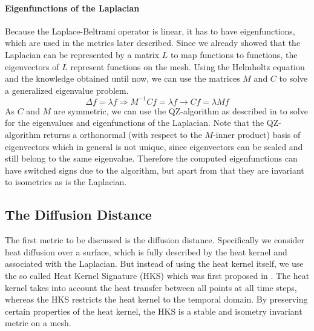 \paragraph{Eigenfunctions of the Laplacian}
Because the Laplace-Beltrami operator is linear, it has to have eigenfunctions, which are used in the metrics later described.
Since we already showed that the Laplacian can be represented by a matrix $L$ to map functions to functions, the eigenvectors of $L$ represent functions on the mesh.
Using the Helmholtz equation and the knowledge obtained until now, we can use the matrices $M$ and $C$ to solve a generalized eigenvalue problem.
\begin{equation}
	\Delta f = \lambda f \Rightarrow M^{-1}C f = \lambda f \rightarrow Cf = \lambda M f
	\label{eq:laplacian:eigenvalue}
\end{equation}
As $C$ and $M$ are symmetric, we can use the QZ-algorithm as described in \cite{moler1973algorithm} to solve for the eigenvalues and eigenfunctions of the Laplacian.
Note that the QZ-algorithm returns a orthonormal (with respect to the $M$-inner product) basis of eigenvectors which in general is not unique, since eigenvectors can be scaled and still belong to the same eigenvalue.
Therefore the computed eigenfunctions can have switched signs due to the algorithm, but apart from that they are invariant to isometries as is the Laplacian.

\subsection{The Diffusion Distance}
The first metric to be discussed is the diffusion distance.
Specifically we consider heat diffusion over a surface, which is fully described by the heat kernel and associated with the Laplacian.
But instead of using the heat kernel itself, we use the so called Heat Kernel Signature (HKS) which was first proposed in \cite{sun2009concise}.
The heat kernel takes into account the heat transfer between all points at all time steps, whereas the HKS restricts the heat kernel to the temporal domain.
By preserving certain properties of the heat kernel, the HKS is a stable and isometry invariant metric on a mesh.

